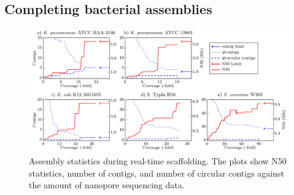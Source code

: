 \subsection{Completing bacterial assemblies} 
\begin{figure}[ht]
\centering
\includegraphics[width=\linewidth]{npscarf/figures/figure2.pdf}
\caption[Assembly statistics during real-time scaffolding]
{Assembly statistics during real-time scaffolding. 
The plots show N50 statistics, number of contigs, and number of
circular contigs against the amount of nanopore sequencing data.}
\label{f:scaffold}
\end{figure}

\newcommand{\cir}{$^\ast$}
\newcommand{\bres}[1]{{\bf #1}}

